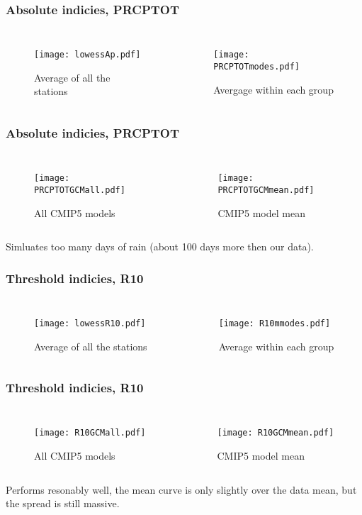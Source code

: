 \documentclass{beamer}
\begin{document}
\begin{frame}
\frametitle{Absolute indicies, PRCPTOT}
\begin{columns}
	\begin{figure}
		\texttt{[image: lowessAp.pdf]}
		\caption{Average of all the stations}
	\end{figure}
\begin{figure}
	\texttt{[image: PRCPTOTmodes.pdf]}
	\caption{Avergage within each group}
\end{figure}
\end{columns}
\end{frame}

\begin{frame}
\frametitle{Absolute indicies, PRCPTOT}
\begin{columns}
	\begin{figure}
		\texttt{[image: PRCPTOTGCMall.pdf]}
		\caption{All CMIP5 models}
	\end{figure}
	\begin{figure}
		\texttt{[image: PRCPTOTGCMmean.pdf]}
		\caption{CMIP5 model mean}
	\end{figure}
\end{columns}
Simluates too many days of rain (about 100 days more then our data).
\end{frame}

\begin{frame}
\frametitle{Threshold indicies, R10}
\begin{columns}
	\begin{figure}
		\texttt{[image: lowessR10.pdf]}
		\caption{Average of all the stations}
	\end{figure}
	\begin{figure}
		\texttt{[image: R10mmodes.pdf]}
		\caption{Average within each group}
	\end{figure}
\end{columns}
\end{frame}

\begin{frame}
\frametitle{Threshold indicies, R10}
\begin{columns}
\begin{figure}
	\texttt{[image: R10GCMall.pdf]}
	\caption{All CMIP5 models}
\end{figure}
\begin{figure}
	\texttt{[image: R10GCMmean.pdf]}
	\caption{CMIP5 model mean}
\end{figure}
\end{columns}
Performs resonably well, the mean curve is only slightly over the data mean, but the spread is still massive.
\end{frame}
\end{document}
